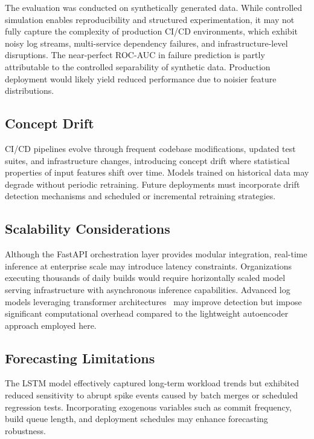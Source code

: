 \documentclass[conference]{IEEEtran}
\begin{document}
The evaluation was conducted on synthetically generated data. While controlled simulation enables reproducibility and structured experimentation, it may not fully capture the complexity of production CI/CD environments, which exhibit noisy log streams, multi-service dependency failures, and infrastructure-level disruptions. The near-perfect ROC-AUC in failure prediction is partly attributable to the controlled separability of synthetic data. Production deployment would likely yield reduced performance due to noisier feature distributions.

\subsection{Concept Drift}

CI/CD pipelines evolve through frequent codebase modifications, updated test suites, and infrastructure changes, introducing concept drift where statistical properties of input features shift over time. Models trained on historical data may degrade without periodic retraining. Future deployments must incorporate drift detection mechanisms and scheduled or incremental retraining strategies.

\subsection{Scalability Considerations}

Although the FastAPI orchestration layer provides modular integration, real-time inference at enterprise scale may introduce latency constraints. Organizations executing thousands of daily builds would require horizontally scaled model serving infrastructure with asynchronous inference capabilities. Advanced log models leveraging transformer architectures~\cite{le2022log} may improve detection but impose significant computational overhead compared to the lightweight autoencoder approach employed here.

\subsection{Forecasting Limitations}

The LSTM model effectively captured long-term workload trends but exhibited reduced sensitivity to abrupt spike events caused by batch merges or scheduled regression tests. Incorporating exogenous variables such as commit frequency, build queue length, and deployment schedules may enhance forecasting robustness.
\end{document}
